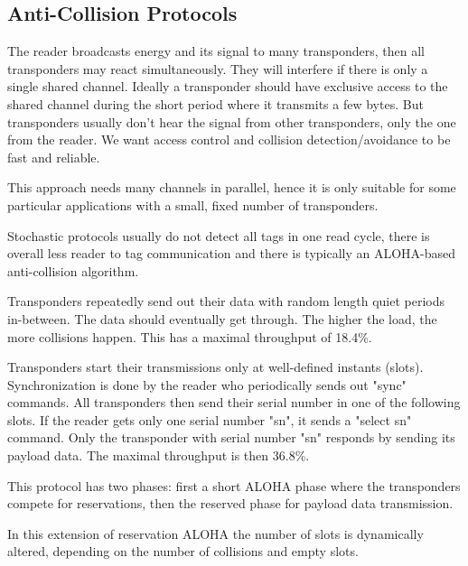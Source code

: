 \subsection{Anti-Collision Protocols}
\begin{mytitle} The reader broadcasts energy and its signal to many transponders, then all transponders may react simultaneously. They will interfere if there is only a single shared channel. Ideally a transponder should have exclusive access to the shared channel during the short period where it transmits a few bytes. But transponders usually don't hear the signal from other transponders, only the one from the reader. We want access control and collision detection/avoidance to be fast and reliable.
\end{mytitle}
\begin{mytitle} This approach needs many channels in parallel, hence it is only suitable for some particular applications with a small, fixed number of transponders.
\end{mytitle}
\begin{mytitle} Stochastic protocols usually do not detect all tags in one read cycle, there is overall less reader to tag communication and there is typically an ALOHA-based anti-collision algorithm.
    \begin{mysubtitle} Transponders repeatedly send out their data with random length quiet periods in-between. The data should eventually get through. The higher the load, the more collisions happen. This has a maximal throughput of 18.4\%.
    \end{mysubtitle}
    \begin{mysubtitle} Transponders start their transmissions only at well-defined instants (slots). Synchronization is done by the reader who periodically sends out "sync" commands. All transponders then send their serial number in one of the following slots. If the reader gets only one serial number "sn", it sends a "select sn" command. Only the transponder with serial number "sn" responds by sending its payload data. The maximal throughput is then 36.8\%. 
    \end{mysubtitle}
    \begin{mysubtitle} This protocol has two phases: first a short ALOHA phase where the transponders compete for reservations, then the reserved phase for payload data transmission. 
    \end{mysubtitle}
    \begin{mysubtitle} In this extension of reservation ALOHA the number of slots is dynamically altered, depending on the number of collisions and empty slots.
    \end{mysubtitle}
\end{mytitle}
